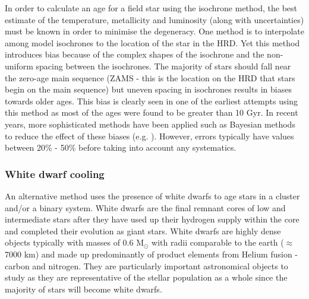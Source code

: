 In order to calculate an age for a field star using the isochrone method, the best estimate of the temperature, metallicity and luminosity (along with uncertainties) must be known in order to minimise the degeneracy. One method is to interpolate among model isochrones to the location of the star in the HRD. Yet this method introduces bias because of the complex shapes of the isochrone and the non-uniform spacing between the isochrones. The majority of stars should fall near the zero-age main sequence (ZAMS - this is the location on the HRD that stars begin on the main sequence) but uneven spacing in isochrones results in biases towards older ages. This bias is clearly seen in one of the earliest attempts using this method \citep{Perrin_etal_1977} as most of the ages were found to be greater than 10 Gyr. In recent years, more sophisticated methods have been applied such as Bayesian methods to reduce the effect of these biases (e.g. \citealt{Takeda_etal_2007}). However, errors typically have values between 20\% - 50\% before taking into account any systematics.

\subsubsection{White dwarf cooling}
An alternative method uses the presence of white dwarfs to age stars in a cluster and/or a binary system. White dwarfs are the final remnant cores of low and intermediate stars after they have used up their hydrogen supply within the core and completed their evolution as giant stars. White dwarfs are highly dense objects typically with masses of 0.6 M$_{\odot}$ with radii comparable to the earth ($\approx$ 7000 km) \citep{Madej_etal_2004} and made up predominantly of product elements from Helium fusion - carbon and nitrogen. They are particularly important astronomical objects to study as they are representative of the stellar population as a whole since the majority of stars will become white dwarfs.

